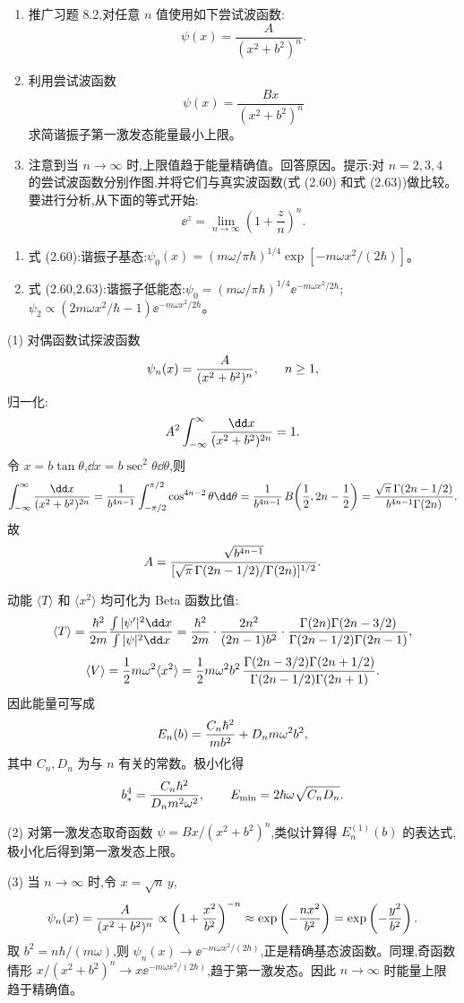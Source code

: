 \begin{question}
\begin{enumerate}
\item 推广习题 8.2,对任意 $n$ 值使用如下尝试波函数:
\[
\psi(x)=\frac{A}{(x^2+b^2)^n}.
\]
\item 利用尝试波函数
\[
\psi(x)=\frac{Bx}{(x^2+b^2)^n}
\]
求简谐振子第一激发态能量最小上限。
\item 注意到当 $n\to\infty$ 时,上限值趋于能量精确值。回答原因。提示:对 $n=2,3,4$ 的尝试波函数分别作图,并将它们与真实波函数(式 (2.60) 和式 (2.63))做比较。要进行分析,从下面的等式开始:
\[
 \ee^z=\lim_{n\to\infty}\left(1+\frac{z}{n}\right)^n.
\]
\end{enumerate}

\par\smallskip
{}
\begin{enumerate}[leftmargin=2.2em,itemsep=0.12em,topsep=0.12em,parsep=0pt]
\item 式 (2.60):谐振子基态:$\psi_0(x)=(m\omega/\pi\hbar)^{1/4}\exp[-m\omega x^2/(2\hbar)]$。
\item 式 (2.60,2.63):谐振子低能态:$\psi_0=(m\omega/\pi\hbar)^{1/4}\ee^{-m\omega x^2/2\hbar}$;$\psi_2\propto(2m\omega x^2/\hbar-1)\ee^{-m\omega x^2/2\hbar}$。
\end{enumerate}

\begin{solution}
(1) 对偶函数试探波函数
\[
\psi_n(x)={A\over(x^2+b^2)^n},\qquad n\ge1,
\]
归一化:
\[
A^2\int_{-\infty}^\infty{\dd x\over(x^2+b^2)^{2n}}=1.
\]
令 $x=b\tan\theta$,$\dd x=b\sec^2\theta\dd\theta$,则
\[
\int_{-\infty}^\infty{\dd x\over(x^2+b^2)^{2n}}
={1\over b^{4n-1}}\int_{-\pi/2}^{\pi/2}\cos^{4n-2}\theta\dd\theta
={1\over b^{4n-1}}\,B\!\left({1\over2},2n-{1\over2}\right)
={\sqrt\pi\,\Gamma(2n-1/2)\over b^{4n-1}\Gamma(2n)}.
\]
故
\[
A={\sqrt{b^{4n-1}}\over[\sqrt\pi\,\Gamma(2n-1/2)/\Gamma(2n)]^{1/2}}.
\]

动能 $\langle T\rangle$ 和 $\langle x^2\rangle$ 均可化为 Beta 函数比值:
\[
\langle T\rangle={\hbar^2\over2m}{\int|\psi'|^2\dd x\over\int|\psi|^2\dd x}
={\hbar^2\over2m}\cdot{2n^2\over(2n-1)b^2}\cdot{\Gamma(2n)\Gamma(2n-3/2)\over\Gamma(2n-1/2)\Gamma(2n-1)},
\]
\[
\langle V\rangle={1\over2}m\omega^2\langle x^2\rangle
={1\over2}m\omega^2b^2\,{\Gamma(2n-3/2)\Gamma(2n+1/2)\over\Gamma(2n-1/2)\Gamma(2n+1)}.
\]
因此能量可写成
\[
E_n(b)={C_n\hbar^2\over mb^2}+D_n m\omega^2 b^2,
\]
其中 $C_n,D_n$ 为与 $n$ 有关的常数。极小化得
\[
b_*^4={C_n\hbar^2\over D_n m^2\omega^2},\qquad
E_{\min}=2\hbar\omega\sqrt{C_nD_n}.
\]

(2) 对第一激发态取奇函数 $\psi=Bx/(x^2+b^2)^n$,类似计算得 $E_n^{(1)}(b)$ 的表达式,极小化后得到第一激发态上限。

(3) 当 $n\to\infty$ 时,令 $x=\sqrt{n}\,y$,
\[
\psi_n(x)={A\over(x^2+b^2)^n}
\propto\left(1+{x^2\over b^2}\right)^{-n}
\approx\exp\left(-{n x^2\over b^2}\right)
=\exp\left(-{y^2\over b^2}\right).
\]
取 $b^2=n\hbar/(m\omega)$,则 $\psi_n(x)\to \ee^{-m\omega x^2/(2\hbar)}$,正是精确基态波函数。同理,奇函数情形 $x/(x^2+b^2)^n\to x \ee^{-m\omega x^2/(2\hbar)}$,趋于第一激发态。因此 $n\to\infty$ 时能量上限趋于精确值。
\end{solution}
\end{question}

